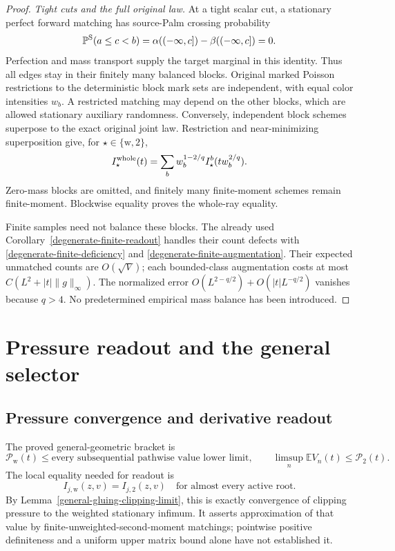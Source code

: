 \documentclass[11pt,reqno]{amsart}
\theoremstyle{definition}
\theoremstyle{remark}
\numberwithin{equation}{section}
\newcommand{\E}{\mathbb E}
\newcommand{\Pp}{\mathbb P}
\begin{document}
\begin{proof}
\emph{Tight cuts and the full original law.}
At a tight scalar cut, a stationary perfect forward matching has
source-Palm crossing probability
\[
 \Pp^{\rm S}(a\le c<b)
       =\alpha((-\infty,c])-\beta((-\infty,c])=0.
\]
Perfection and mass transport supply the target marginal in this
identity. Thus all edges stay in their finitely many balanced
blocks. Original marked Poisson restrictions to the deterministic
block mark sets are independent, with equal color intensities
\(w_b\). A restricted matching may depend on the other blocks,
which are allowed stationary auxiliary randomness. Conversely,
independent block schemes superpose to the exact original joint
law. Restriction and near-minimizing superposition give, for
\(\star\in\{\mathrm w,2\}\),
\begin{equation}
 I_\star^{\rm whole}(t)
       =\sum_b w_b^{1-2/q}I_\star^b(tw_b^{2/q}).
 \label{eq:interleaved-root-block-scaling}
\end{equation}
Zero-mass blocks are omitted, and finitely many finite-moment schemes
remain finite-moment. Blockwise equality proves the whole-ray equality.

Finite samples need not balance these blocks. The already used
Corollary~\ref{degenerate-finite-readout} handles their count defects
with \eqref{degenerate-finite-deficiency} and
\eqref{degenerate-finite-augmentation}. Their expected unmatched
counts are \(O(\sqrt V)\); each bounded-class augmentation costs
at most \(C(L^2+|t|\|g\|_\infty)\). The normalized error
\(O(L^{2-q/2})+O(|t|L^{-q/2})\) vanishes because \(q>4\).
No predetermined empirical mass balance has been introduced.
\end{proof}

\section{Pressure readout and the general selector}\label{sec:finsler-extension}

\subsection{Pressure convergence and derivative readout}

The proved general-geometric bracket is
\begin{equation}
\label{general-gluing-pressure-bracket}
 \mathcal P_{\mathrm w}(t)
 \le \text{every subsequential pathwise value lower limit},
 \qquad
 \limsup_n\E V_n(t)\le\mathcal P_2(t).
\end{equation}
The local equality needed for readout is
\begin{equation}
\label{general-gluing-relaxation-condition}
 I_{j,\mathrm w}(z,v)=I_{j,2}(z,v)
       \quad\text{for almost every active root}.
\end{equation}
By Lemma~\ref{general-gluing-clipping-limit}, this is exactly convergence
of clipping pressure to the weighted stationary infimum. It asserts
approximation of that value by finite-unweighted-second-moment matchings;
pointwise positive definiteness and a uniform upper matrix bound alone
have not established it.
\end{document}
